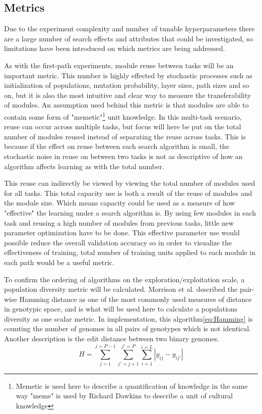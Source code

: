 \subsection{Metrics}\label{Search-experiment:Metrics}
Due to the experiment complexity and number of tunable hyperparameters there are a large number of search effects and attributes that could be investigated, so limitations have been introduced on which metrics are being addressed. 

As with the first-path experiments, module reuse between tasks will be an important metric. This number is highly effected by stochastic processes such as initialization of populations, mutation probability, layer sizes, path sizes and so on, but it is also the most intuitive and clear way to measure the transferability of modules. An assumption used behind this metric is that modules are able to contain some form of "memetic"\footnote{Memetic is used here to describe a quantification of knowledge in the same way "meme" is used by Richard Dawkins\cite{selfishGene} to describe a unit of cultural knowledge} unit knowledge. In this multi-task scenario, reuse can occur across multiple tasks, but focus will here be put on the total number of modules reused instead of separating the reuse across tasks. This is because if the effect on reuse between each search algorithm is small, the stochastic noise in reuse on between two tasks is not as descriptive of how an algorithm affects learning as with the total number. 

This reuse can indirectly be viewed by viewing the total number of modules used for all tasks. This total capacity use is both a result of the reuse of modules and the module size. Which means capacity could be used as a measure of how "effective" the learning under a search algorithm is. By using few modules in each task and reusing a high number of modules from previous tasks, little new parameter optimization have to be done. This effective parameter use would possible reduce the overall validation accuracy so in order to visualize the effectiveness of training, total number of training units applied to each module in each path would be a useful metric. 

To confirm the ordering of algorithms on the exploration/exploitation scale, a population diversity metric will be calculated. Morrison et al.\cite{populationDiversity} described the pair-wise Hamming distance as one of the most commonly used measures of distance in genotypic space, and is what will be used here to calculate a populations diversity as one scalar metric. In implementation, this algorithm\ref{eq:Hamming} is counting the number of genomes in all pairs of genotypes which is not identical. Another description is the edit distance between two binary genomes. 
\begin{equation}
    \label{eq:Hamming}
    H=\sum_{j=1}^{j=P-1}\sum_{{j}'=j+1}^{{j}'=P}\sum_{i=1}^{i=L}\left |y_{ij}-y_{i{j}'}\right |
\end{equation}

